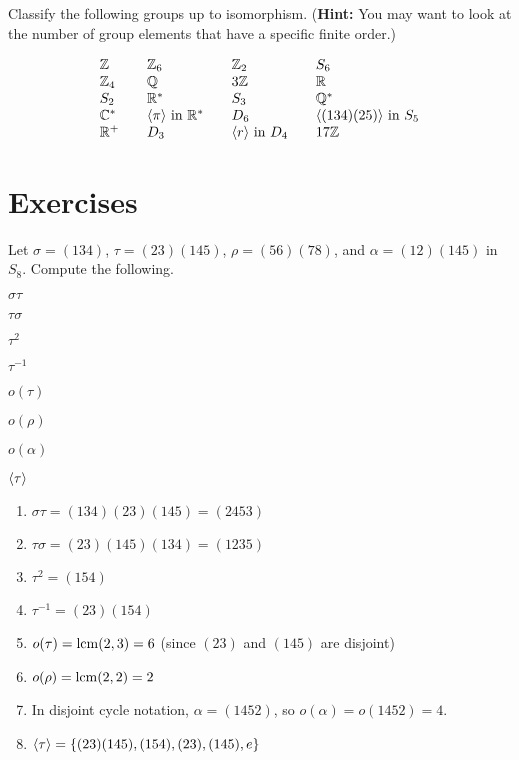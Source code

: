 \begin{example}{}
Classify the following groups up to isomorphism. (\textbf{Hint:}
You may want to look at the number of group elements that have
a specific finite order.)

\renewcommand{\arraystretch}{2}
$$\begin{array}{lllllll}

\Z && \Z_6 && \Z_2&& S_6\\
\Z_4 && \fatq && 3\Z && \fatr\\
S_2&& \fatr^* && S_3 && \fatq^*\\
\fatc^* && \<\pi\> \mbox{ in } \fatr^* &&  D_6 &&\<(134)(25)\>
\mbox{ in } S_5\\
\fatr^+ && D_3 && \<r\> \mbox{ in } D_4 &&17\Z \hspace{50pt}
\end{array}$$
\end{example}


\pagebreak
\section{Exercises}



\begin{exercise}
Let $\sigma=(134)$, $\tau=(23)(145)$, $\rho=(56)(78)$, and $\alpha=(12)(145)$ in $S_8$. Compute the following.

\medskip
\noindent
\begin{inparaenum}[(a)] \item $\sigma \tau$ \hfill \item $\tau \sigma$  \hfill \item $\tau^2$  \hfill \item $\tau^{-1}$  \hfill \item $o(\tau)$  \hfill \item $o(\rho)$  \hfill \item $o(\alpha)$  \hfill \item $\langle\tau\rangle$
\end{inparaenum}
\end{exercise}

\begin{solution}[print=false]


\begin{enumerate}
\item $\sigma \tau= (134)(23)(145)=(2453)$
\item $\tau \sigma=  (23)(145)(134)=(1235)$
\item $\tau^2=(154)$
\item $\tau^{-1}=(23)(154)$
\item $o(\tau)=\operatorname{lcm}(2,3)=6$ (since $(23)$ and $(145)$ are disjoint)
\item $o(\rho)=\operatorname{lcm}(2,2)=2$
\item In disjoint cycle notation, $\alpha=(1452)$, so $o(\alpha)=o(1452)=4$.
\item $\langle\tau\rangle=\{(23)(145), (154), (23), (145), e\}$
\end{enumerate}

\end{solution}

